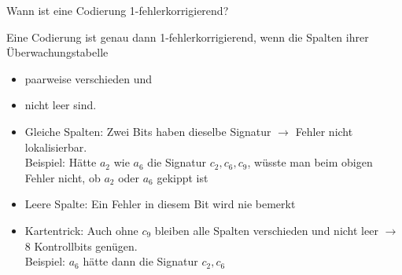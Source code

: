 \begin{frame}{Wann ist eine Codierung 1-fehlerkorrigierend?}
    \begin{myremark}[Merksatz]
        Eine Codierung ist genau dann 1-fehlerkorrigierend, wenn die Spalten ihrer Überwachungstabelle
        \begin{itemize}
            \item paarweise verschieden und
            \item nicht leer sind.
        \end{itemize}
    \end{myremark}
    \pause
    \begin{itemize}[<+->]
        \item Gleiche Spalten: Zwei Bits haben dieselbe Signatur $\rightarrow$ Fehler nicht lokalisierbar.\\
              Beispiel: Hätte \(a_2\) wie \(a_6\) die Signatur \(c_2, c_6, c_9\), wüsste man beim obigen Fehler nicht, ob \(a_2\) oder \(a_6\) gekippt ist
        \item Leere Spalte: Ein Fehler in diesem Bit wird nie bemerkt
        \item Kartentrick: Auch ohne \(c_9\) bleiben alle Spalten verschieden und nicht leer $\rightarrow$ 8 Kontrollbits genügen.\\
              Beispiel: \(a_6\) hätte dann die Signatur \(c_2, c_6\)
    \end{itemize}
\end{frame}


